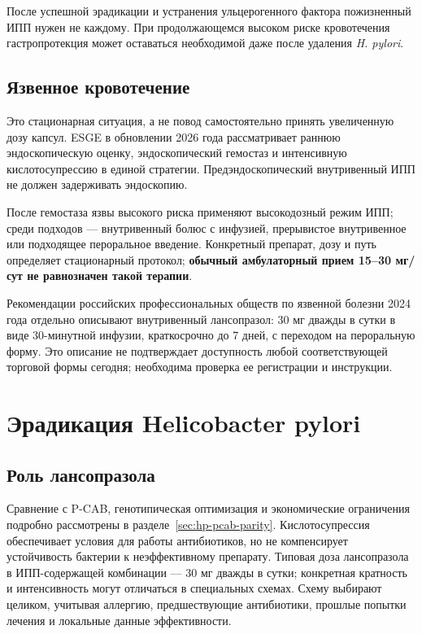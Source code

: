 \documentclass[11pt,a4paper,notitlepage]{report}
\newcommand{\Hp}{\textit{H. pylori}}
\newcommand{\src}[1]{\unskip\space\cite{#1}}
\begin{document}
После успешной эрадикации и устранения ульцерогенного фактора пожизненный ИПП нужен не каждому. При продолжающемся высоком риске кровотечения гастропротекция может оставаться необходимой даже после удаления \Hp.\src{aspirintrial,agadepres}

\subsection{Язвенное кровотечение}
\label{sec:ulcer-bleeding}
Это стационарная ситуация, а не повод самостоятельно принять увеличенную дозу капсул. ESGE в обновлении 2026 года рассматривает раннюю эндоскопическую оценку, эндоскопический гемостаз и интенсивную кислотосупрессию в единой стратегии. Предэндоскопический внутривенный ИПП не должен задерживать эндоскопию.\src{esge2026}

После гемостаза язвы высокого риска применяют высокодозный режим ИПП; среди подходов --- внутривенный болюс с инфузией, прерывистое внутривенное или подходящее пероральное введение. Конкретный препарат, дозу и путь определяет стационарный протокол; \textbf{обычный амбулаторный прием 15--30 мг/сут не равнозначен такой терапии}.\src{esge2026}

Рекомендации российских профессиональных обществ по язвенной болезни 2024 года отдельно описывают внутривенный лансопразол: 30 мг дважды в сутки в виде 30-минутной инфузии, краткосрочно до 7 дней, с переходом на пероральную форму. Это описание не подтверждает доступность любой соответствующей торговой формы сегодня; необходима проверка ее регистрации и инструкции.\src{rfpud,grls}

\section{Эрадикация Helicobacter pylori}
\label{sec:eradication}

\subsection{Роль лансопразола}
Сравнение с P-CAB, генотипическая оптимизация и экономические ограничения подробно рассмотрены в разделе~\ref{sec:hp-pcab-parity}.
Кислотосупрессия обеспечивает условия для работы антибиотиков, но не компенсирует устойчивость бактерии к неэффективному препарату. Типовая доза лансопразола в ИПП-содержащей комбинации --- 30 мг дважды в сутки; конкретная кратность и интенсивность могут отличаться в специальных схемах. Схему выбирают целиком, учитывая аллергию, предшествующие антибиотики, прошлые попытки лечения и локальные данные эффективности.\src{maastricht,cpic,nice}
\end{document}
